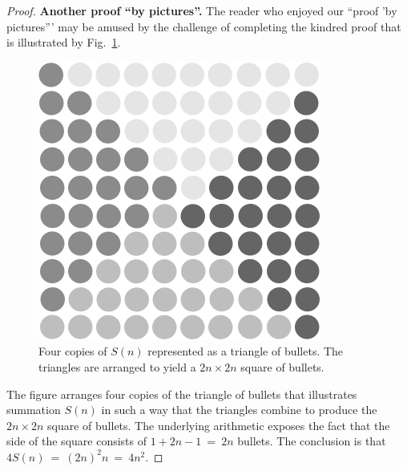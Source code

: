\begin{proof}
{\bf Another proof ``by pictures''.}
%
The reader who enjoyed our ``proof 'by pictures''' may be amused by
the challenge of completing the kindred proof that is illustrated by
Fig.~\ref{fig:anotherSumOdds}.
\begin{figure}[ht]
\begin{center}
       \includegraphics[scale=0.4]{FiguresMaths/Deltaodd}
\caption{Four copies of $S(n)$ represented as a triangle of bullets.
  The triangles are arranged to yield a $2n \times 2n$ square of
  bullets.}
       \label{fig:anotherSumOdds}
\end{center}
\end{figure}
The figure arranges four copies of the triangle of bullets that
illustrates summation $S(n)$ in such a way that the triangles combine
to produce the $2n \times 2n$ square of bullets.  The underlying
arithmetic exposes the fact that the side of the square consists of
$1+2n-1 \ = \ 2n$ bullets.  The conclusion is that $4 S(n) \ =
\ (2n)^2n \ = \ 4n^2$.
\end{proof}

\medskip

